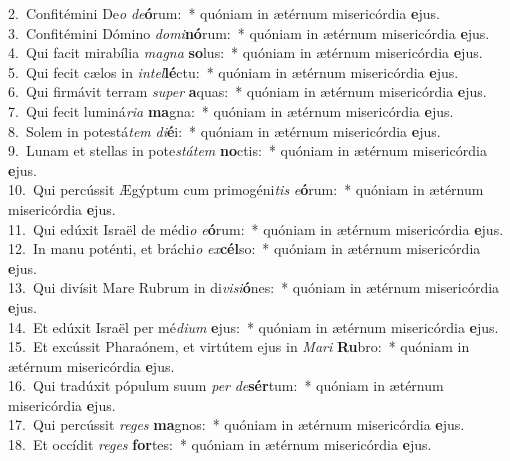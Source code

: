 {2.~}Confitémini De\textit{o} \textit{de}\textbf{ó}rum:~* quóniam in ætérnum misericórdia \textbf{e}jus.\\
{3.~}Confitémini Dómino \textit{do}\textit{mi}\textbf{nó}rum:~* quóniam in ætérnum misericórdia \textbf{e}jus.\\
{4.~}Qui facit mirabília \textit{ma}\textit{gna} \textbf{so}lus:~* quóniam in ætérnum misericórdia \textbf{e}jus.\\
{5.~}Qui fecit cælos in \textit{in}\textit{tel}\textbf{lé}ctu:~* quóniam in ætérnum misericórdia \textbf{e}jus.\\
{6.~}Qui firmávit terram \textit{su}\textit{per} \textbf{a}quas:~* quóniam in ætérnum misericórdia \textbf{e}jus.\\
{7.~}Qui fecit luminá\textit{ri}\textit{a} \textbf{ma}gna:~* quóniam in ætérnum misericórdia \textbf{e}jus.\\
{8.~}Solem in potestá\textit{tem} \textit{di}\textbf{é}i:~* quóniam in ætérnum misericórdia \textbf{e}jus.\\
{9.~}Lunam et stellas in pote\textit{stá}\textit{tem} \textbf{no}ctis:~* quóniam in ætérnum misericórdia \textbf{e}jus.\\
{10.~}Qui percússit Ægýptum cum primogéni\textit{tis} \textit{e}\textbf{ó}rum:~* quóniam in ætérnum misericórdia \textbf{e}jus.\\
{11.~}Qui edúxit Israël de médi\textit{o} \textit{e}\textbf{ó}rum:~* quóniam in ætérnum misericórdia \textbf{e}jus.\\
{12.~}In manu poténti, et bráchi\textit{o} \textit{ex}\textbf{cél}so:~* quóniam in ætérnum misericórdia \textbf{e}jus.\\
{13.~}Qui divísit Mare Rubrum in di\textit{vi}\textit{si}\textbf{ó}nes:~* quóniam in ætérnum misericórdia \textbf{e}jus.\\
{14.~}Et edúxit Israël per mé\textit{di}\textit{um} \textbf{e}jus:~* quóniam in ætérnum misericórdia \textbf{e}jus.\\
{15.~}Et excússit Pharaónem, et virtútem ejus in \textit{Ma}\textit{ri} \textbf{Ru}bro:~* quóniam in ætérnum misericórdia \textbf{e}jus.\\
{16.~}Qui tradúxit pópulum suum \textit{per} \textit{de}\textbf{sér}tum:~* quóniam in ætérnum misericórdia \textbf{e}jus.\\
{17.~}Qui percússit \textit{re}\textit{ges} \textbf{ma}gnos:~* quóniam in ætérnum misericórdia \textbf{e}jus.\\
{18.~}Et occídit \textit{re}\textit{ges} \textbf{for}tes:~* quóniam in ætérnum misericórdia \textbf{e}jus.\\
